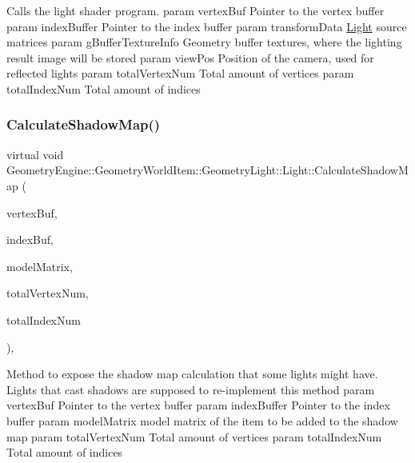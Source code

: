 Calls the light shader program. param vertex\+Buf Pointer to the vertex buffer param index\+Buffer Pointer to the index buffer param transform\+Data \mbox{\hyperlink{class_geometry_engine_1_1_geometry_world_item_1_1_geometry_light_1_1_light}{Light}} source matrices param g\+Buffer\+Texture\+Info Geometry buffer textures, where the lighting result image will be stored param view\+Pos Position of the camera, used for reflected lights param total\+Vertex\+Num Total amount of vertices param total\+Index\+Num Total amount of indices \mbox{\label{class_geometry_engine_1_1_geometry_world_item_1_1_geometry_light_1_1_light_a76aff3602f7bf26416c36111ab79f898}} 
\subsubsection{\texorpdfstring{CalculateShadowMap()}{CalculateShadowMap()}}
{\footnotesize\ttfamily virtual void Geometry\+Engine\+::\+Geometry\+World\+Item\+::\+Geometry\+Light\+::\+Light\+::\+Calculate\+Shadow\+Map (\begin{DoxyParamCaption}\item[{Q\+Open\+G\+L\+Buffer $\ast$}]{vertex\+Buf,  }\item[{Q\+Open\+G\+L\+Buffer $\ast$}]{index\+Buf,  }\item[{const Q\+Matrix4x4 \&}]{model\+Matrix,  }\item[{unsigned int}]{total\+Vertex\+Num,  }\item[{unsigned int}]{total\+Index\+Num }\end{DoxyParamCaption})\hspace{0.3cm}{\ttfamily [inline]}, {\ttfamily [virtual]}}

Method to expose the shadow map calculation that some lights might have. Lights that cast shadows are supposed to re-\/implement this method param vertex\+Buf Pointer to the vertex buffer param index\+Buffer Pointer to the index buffer param model\+Matrix model matrix of the item to be added to the shadow map param total\+Vertex\+Num Total amount of vertices param total\+Index\+Num Total amount of indices 

